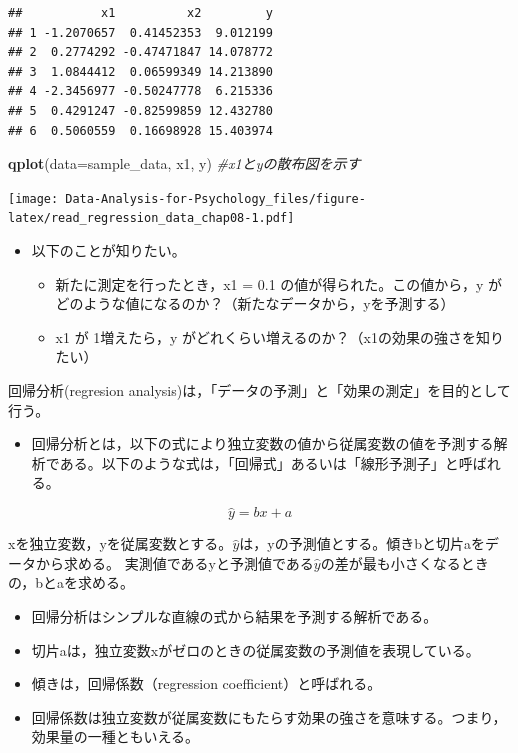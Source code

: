 \documentclass[]{article}
\newenvironment{Shaded}{\begin{snugshade}}{\end{snugshade}}
\newcommand{\KeywordTok}[1]{\textcolor[rgb]{0.13,0.29,0.53}{\textbf{#1}}}
\newcommand{\DataTypeTok}[1]{\textcolor[rgb]{0.13,0.29,0.53}{#1}}
\newcommand{\CommentTok}[1]{\textcolor[rgb]{0.56,0.35,0.01}{\textit{#1}}}
\newcommand{\NormalTok}[1]{#1}
\providecommand{\tightlist}{%
  \setlength{\itemsep}{0pt}\setlength{\parskip}{0pt}}
\begin{document}
\begin{verbatim}
##           x1          x2         y
## 1 -1.2070657  0.41452353  9.012199
## 2  0.2774292 -0.47471847 14.078772
## 3  1.0844412  0.06599349 14.213890
## 4 -2.3456977 -0.50247778  6.215336
## 5  0.4291247 -0.82599859 12.432780
## 6  0.5060559  0.16698928 15.403974
\end{verbatim}

\begin{Shaded}
\begin{Highlighting}[]
\KeywordTok{qplot}\NormalTok{(}\DataTypeTok{data=}\NormalTok{sample_data, x1, y) }\CommentTok{#x1とyの散布図を示す}
\end{Highlighting}
\end{Shaded}

\texttt{[image: Data-Analysis-for-Psychology\_files/figure-latex/read\_regression\_data\_chap08-1.pdf]}

\begin{itemize}
\item
  以下のことが知りたい。

  \begin{itemize}
  \tightlist
  \item
    新たに測定を行ったとき，x1 = 0.1 の値が得られた。この値から，y
    がどのような値になるのか？（新たなデータから，yを予測する）
  \item
    x1 が 1増えたら，y
    がどれくらい増えるのか？（x1の効果の強さを知りたい）
  \end{itemize}
\end{itemize}

回帰分析(regresion
analysis)は，「データの予測」と「効果の測定」を目的として行う。

\begin{itemize}
\tightlist
\item
  回帰分析とは，以下の式により独立変数の値から従属変数の値を予測する解析である。以下のような式は，「回帰式」あるいは「線形予測子」と呼ばれる。
\end{itemize}

\[
\hat{y} = bx+a
\]

xを独立変数，yを従属変数とする。\(\hat{y}\)は，yの予測値とする。傾きbと切片aをデータから求める。
実測値であるyと予測値である\(\hat{y}\)の差が最も小さくなるときの，bとaを求める。

\begin{itemize}
\tightlist
\item
  回帰分析はシンプルな直線の式から結果を予測する解析である。
\item
  切片aは，独立変数xがゼロのときの従属変数の予測値を表現している。\\
\item
  傾きは，回帰係数（regression coefficient）と呼ばれる。\\
\item
  回帰係数は独立変数が従属変数にもたらす効果の強さを意味する。つまり，効果量の一種ともいえる。
\end{itemize}
\end{document}
